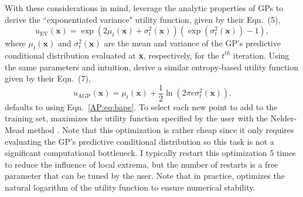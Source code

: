 With these considerations in mind, \citet{Kandasamy2017} leverage the analytic properties of GPs to derive the ``exponentiated variance" utility function, given by their Eqn.~(5),
\begin{equation} \label{AP:eq:bape}
    u_{\textrm{EV}}(\textbf{x}) = \exp(2 \mu_t(\textbf{x}) + \sigma_t^2(\textbf{x}))(\exp(\sigma_t^2(\textbf{x})) - 1),
\end{equation}
where $\mu_t(\textbf{x})$ and $\sigma_t^2(\textbf{x})$ are the mean and variance of the GP's predictive conditional distribution evaluated at \textbf{x}, respectively, for the $t^{th}$ \approxposterior iteration. Using the same parameters and intuition, \citet{Wang2018} derive a similar entropy-based utility function given by their Eqn.~(7),
\begin{equation} \label{AP:eq:agp}
    u_{\textrm{AGP}}(\textbf{x}) =\mu_t(\textbf{x}) + \frac{1}{2} \ln(2 \pi e \sigma_t^2(\textbf{x})).
\end{equation}
\approxposterior defaults to using Eqn.~\ref{AP:eq:bape}. To select each new point to add to the training set, \approxposterior maximizes the utility function specified by the user with the Nelder-Mead method \citep{Nelder1965}. Note that this optimization is rather cheap since it only requires evaluating the GP's predictive conditional distribution so this task is not a significant computational bottleneck. I typically restart this optimization 5 times to reduce the influence of local extrema, but the number of restarts is a free parameter that can be tuned by the user.  Note that in practice, \approxposterior optimizes the natural logarithm of the utility function to ensure numerical stability.

